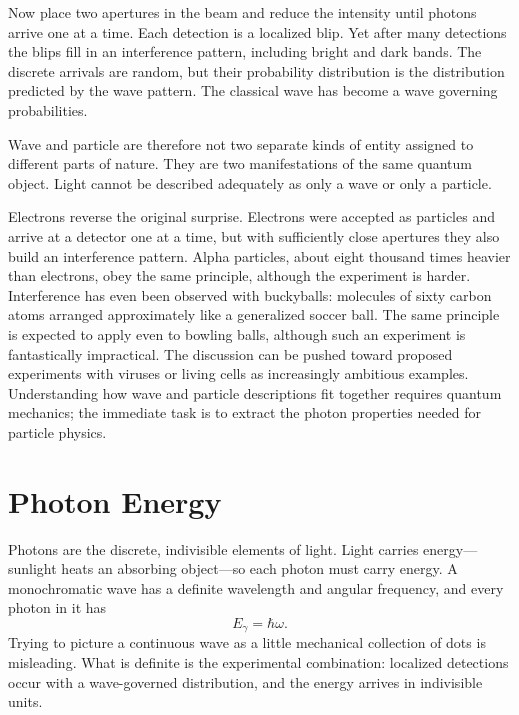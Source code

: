 Now place two apertures in the beam and reduce the intensity until photons arrive one at a time. Each detection is a localized blip. Yet after many detections the blips fill in an interference pattern, including bright and dark bands. The discrete arrivals are random, but their probability distribution is the distribution predicted by the wave pattern. The classical wave has become a wave governing probabilities.

Wave and particle are therefore not two separate kinds of entity assigned to different parts of nature. They are two manifestations of the same quantum object. Light cannot be described adequately as only a wave or only a particle.

Electrons reverse the original surprise. Electrons were accepted as particles and arrive at a detector one at a time, but with sufficiently close apertures they also build an interference pattern. Alpha particles, about eight thousand times heavier than electrons, obey the same principle, although the experiment is harder. Interference has even been observed with buckyballs: molecules of sixty carbon atoms arranged approximately like a generalized soccer ball. The same principle is expected to apply even to bowling balls, although such an experiment is fantastically impractical. The discussion can be pushed toward proposed experiments with viruses or living cells as increasingly ambitious examples. Understanding how wave and particle descriptions fit together requires quantum mechanics; the immediate task is to extract the photon properties needed for particle physics.

\section{Photon Energy}

Photons are the discrete, indivisible elements of light. Light carries energy---sunlight heats an absorbing object---so each photon must carry energy. A monochromatic wave has a definite wavelength and angular frequency, and every photon in it has
\begin{equation}
E_\gamma=\hbar\omega.
\end{equation}
Trying to picture a continuous wave as a little mechanical collection of dots is misleading. What is definite is the experimental combination: localized detections occur with a wave-governed distribution, and the energy arrives in indivisible units.

